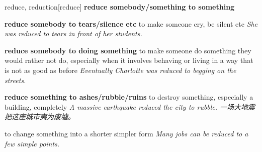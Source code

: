 \begin{DefWord}{reduce, reduction}[reduce]
    \textbf{reduce somebody/something to something}

    \textbf{reduce somebody to tears/silence etc} to make someone cry, be silent etc
    \textit{She was reduced to tears in front of her students.}

    \textbf{reduce somebody to doing something} to make someone do something they would rather not do, especially when it involves behaving or living in a way that is not as good as before
    \textit{Eventually Charlotte was reduced to begging on the streets.}

    \textbf{reduce something to ashes/rubble/ruins}
    to destroy something, especially a building, completely
    \textit{A massive earthquake reduced the city to rubble. 一场大地震把这座城市夷为废墟。 }

    to change something into a shorter simpler form
    \textit{Many jobs can be reduced to a few simple points.}
\end{DefWord}